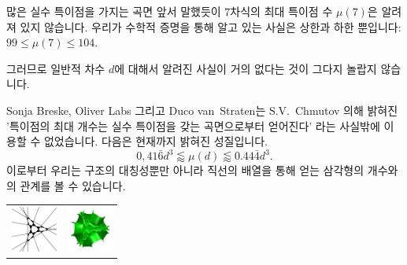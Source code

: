 \begin{surferPage}{많은 실수 특이점을 가지는 곡면}
    앞서 말했듯이 $7$차식의 최대 특이점 수 $\mu(7)$은 알려져 있지 않습니다. 우리가 수학적 증명을 통해 알고 있는 사실은 상한과 하한 뿐입니다:
$99\le \mu(7) \le 104$.


    그러므로 일반적 차수 $d$에 대해서 알려진 사실이 거의 없다는 것이 그다지 놀랍지 않습니다. 

    Sonja Breske, Oliver Labs 그리고 Duco van~Straten는 S.V.\ Chmutov 의해 밝혀진 '특이점의 최대 개수는 실수 특이점을 갖는 곡면으로부터 얻어진다' 라는 사실밖에 이용할 수 없었습니다. 다음은 현재까지 밝혀진 성질입니다.
    \[0,41\bar{6}d^3 \lessapprox \mu(d) \lessapprox 0.44\bar{4} d^3.\]
    이로부터 우리는 구조의 대칭성뿐만 아니라 직선의 배열을 통해 얻는 삼각형의 개수와의 관계를 볼 수 있습니다. 

    \begin{center}
      \begin{tabular}{c@{\qquad}c}
        \includegraphics[height=1.5cm]{./../../common/images/vielesing.pdf}
        &
        \includegraphics[height=1.5cm]{./../../common/images/p9surface_von_oben}
      \end{tabular}
    \end{center}
\end{surferPage}

